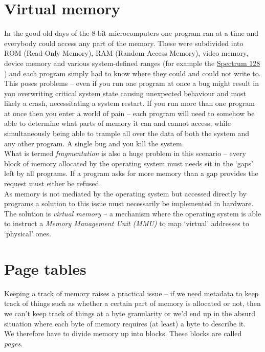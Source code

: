 \section{Virtual memory}

In the good old days of the 8-bit microcomputers one program ran at a time and
everybody could access any part of the memory. These were subdivided into ROM
(Read-Only Memory), RAM (Random-Access Memory), video memory, device memory and
various system-defined ranges (for example the
\href{https://worldofspectrum.org/ZXSpectrum128+3Manual/chapter8pt24.html}{Spectrum
  128} \autocite{spectrum128-manual:c8pt24}) and each program simply had to know
where they could and could not write to.\\

This poses problems -- even if you run one program at once a bug might result in
you overwriting critical system state causing unexpected behaviour and most
likely a crash, necessitating a system restart. If you run more than one program
at once then you enter a world of pain -- each program will need to somehow be
able to determine what parts of memory it can and cannot access, while
simultaneously being able to trample all over the data of both the system and
any other program. A single bug and you kill the system.\\

What is termed \emph{fragmentation} is also a huge problem in this scenario --
every block of memory allocated by the operating system must needs sit in the
`gaps' left by all programs. If a program asks for more memory than a gap
provides the request must either be refused.\\

As memory is not mediated by the operating system but accessed directly by
programs a solution to this issue must necessarily be implemented in
hardware. The solution is \emph{virtual memory} -- a mechanism where the
operating system is able to instruct a \emph{Memory Management Unit (MMU)} to
map `virtual' addresses to `physical' ones.

\section{Page tables}
Keeping a track of memory raises a practical issue -- if we need metadata to
keep track of things such as whether a certain part of memory is allocated or
not, then we can't keep track of things at a byte granularity or we'd end up in
the absurd situation where each byte of memory requires (at least) a byte to
describe it.\\

We therefore have to divide memory up into blocks. These blocks are called
\emph{pages}.
